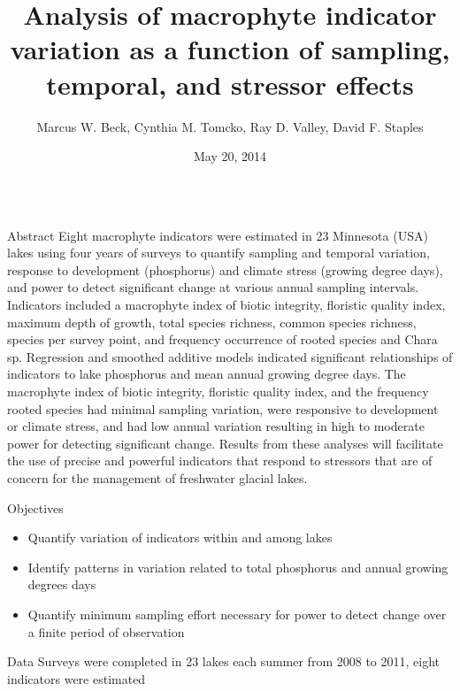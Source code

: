 \documentclass[final,t]{beamer}\usepackage[]{graphicx}\usepackage[]{color}
\title{\LARGE Analysis of macrophyte indicator variation as a function of sampling, temporal, and stressor effects}
\author[Beck et al.]{Marcus W. Beck, Cynthia M. Tomcko, Ray D. Valley, David F. Staples}
\institute[CB Grad Program, U of M]{University of Minnesota, Minnesota Dept. of Natural Resources, St. Paul, MN}
\date[May 20, 2014]{May 20, 2014}
\begin{document}
\begin{frame}{}

\vspace{-0.6cm} %
\begin{columns}[t]
\hspace{0.4cm}

\begin{column}{.31\linewidth}

\begin{block}{Abstract}
\alert{Eight macrophyte indicators were estimated in 23 Minnesota (USA) lakes using four years of surveys to quantify sampling and temporal variation, response to development (phosphorus) and climate stress (growing degree days), and power to detect significant change at various annual sampling intervals.  Indicators included a macrophyte index of biotic integrity, floristic quality index, maximum depth of growth, total species richness, common species richness, species per survey point, and frequency occurrence of rooted species and Chara sp.  Regression and smoothed additive models indicated significant relationships of indicators to lake phosphorus and mean annual growing degree days.  The macrophyte index of biotic integrity, floristic quality index, and the frequency rooted species had minimal sampling variation, were responsive to development or climate stress, and had low annual variation resulting in high to moderate power for detecting significant change.  Results from these analyses will facilitate the use of precise and powerful indicators that respond to stressors that are of concern for the management of freshwater glacial lakes.}
\end{block}

\begin{block}{Objectives}
\begin{itemize}
\item Quantify variation of indicators within and among lakes
\item Identify patterns in variation related to total phosphorus and annual growing degrees days
\item Quantify minimum sampling effort necessary for power to detect change over a finite period of observation 
\end{itemize}

\end{block}

\begin{block}{Data}
Surveys were completed in \alert{23 lakes} each summer from \alert{2008 to 2011}, eight indicators were estimated
\vspace{1cm}
\begin{columns}[b]
\begin{column}{0.45\linewidth}


\end{column}
\end{columns}
\end{block}
\end{column}
\end{columns}
\end{frame}
\end{document}
